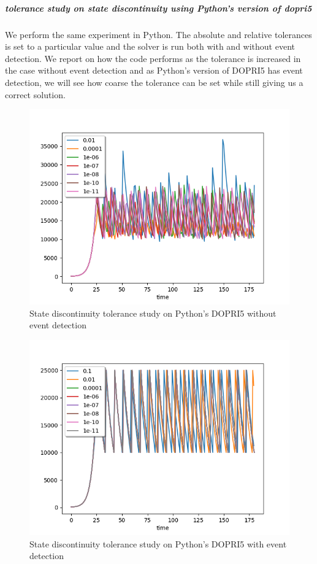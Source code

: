 \subparagraph{tolerance study on state discontinuity using Python's version of dopri5}
We perform the same experiment in Python. The absolute and relative tolerances is set to a particular value and the solver is run both with and without event detection. We report on how the code performs as the tolerance is increased in the case without event detection and as Python's version of DOPRI5 has event detection, we will see how coarse the tolerance can be set while still giving us a correct solution. 

\begin{figure}[h]
	\centering
	\includegraphics[width=0.7\linewidth]{./figures/tolerance_state_rk45_no_event_py}
	\caption{State discontinuity tolerance study on Python's DOPRI5 without event detection}
	\label{fig:tolerance_state_rk45_no_event_py}
\end{figure}

\begin{figure}[h]
	\centering
	\includegraphics[width=0.7\linewidth]{./figures/tolerance_state_rk45_with_event_py}
	\caption{State discontinuity tolerance study on Python's DOPRI5 with event detection}
	\label{fig:tolerance_state_rk45_with_event_py}
\end{figure}

